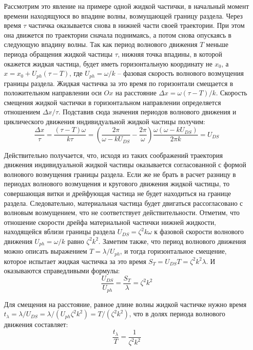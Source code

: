 Рассмотрим это явление на примере одной жидкой частички, в начальный момент времени находящуюся во впадине волны, возмущающей границу раздела. Через время $ \tau $ частичка оказывается снова в нижней части своей траектории. При этом она движется по траектории сначала поднимаясь, а потом снова опускаясь в следующую впадину волны. Так как период волнового движения $ T $ меньше периода обращения жидкой частицы $ \tau $, нижняя точка впадины, в которой окажется жидкая частица, будет иметь горизонтальную координату не $ x_{0} $, а $ x=x_{0}+U_{ph}\left( \tau -T\right) $, где $ U_{ph}=\omega/k $ – фазовая скорость волнового возмущения границы раздела. Жидкая частичка за это время по горизонтали смещается в положительном направлении оси $ Ox $ на расстояние $ \Delta x = \omega \left( \tau -T\right)/k $. Скорость смещения жидкой частички в горизонтальном направлении определяется отношением $ \Delta x/\tau $. Подставив сюда значения периодов волнового движения и циклического движения индивидуальной жидкой частицы получим:
\begin{equation*}
\dfrac{\Delta x}{\tau}=\dfrac{\left( \tau -T\right) \omega}{k \tau}=\left( \dfrac{2 \pi}{\omega - k U_{DS} } - \dfrac{2 \pi}{\omega}\right)\dfrac{\omega \left( \omega - k U_{DS}\right)}{2 \pi k}=U_{DS}
\end{equation*}

Действительно получается, что, исходя из таких соображений траектория движения индивидуальной жидкой частицы оказывается согласованной с формой волнового возмущения границы раздела. Если же не брать в расчет разницу в периодах волнового возмущения и кругового движения жидкой частицы, то совершающая витки и дрейфующая частица не будет находиться на границе раздела. Следовательно, материальная частица будет двигаться рассогласовано с волновым возмущением, что не соответствует действительности. Отметим, что отношение скорости дрейфа материальной частички нижней жидкости, находящейся вблизи границы раздела $ U_{DS}=\zeta^{2} k \omega $ к фазовой скорости волнового движения $ U_{ph}=\omega / k $ равно $ \zeta^{2} k^{2} $. Заметим также, что период волнового  движения можно описать выражением $ T=\lambda / U_{ph} $, и тогда горизонтальное смещение, которое испытает жидкая частичка за это время $ S_{T}=U_{DS} T=\zeta^{2} k^{2} \lambda $. И оказываются справедливыми формулы:
\begin{equation*}
\dfrac{U_{DS}}{U_{ph}}=\dfrac{S_{T}}{\lambda}=\zeta^{2} k^{2}
\end{equation*}

Для смещения на расстояние, равное длине волны жидкой частичке нужно время $ t_{\lambda}=\lambda /U_{DS}=\lambda / \left( U_{ph} \zeta^{2} k^{2} \right) =T /  \left( \zeta^{2} k^{2} \right)$, что в долях периода волнового движения составляет:
\begin{equation}
\dfrac{t_{\lambda}}{T}=\dfrac{1}{\zeta^{2} k^{2}}
\label{Period}
\end{equation}

